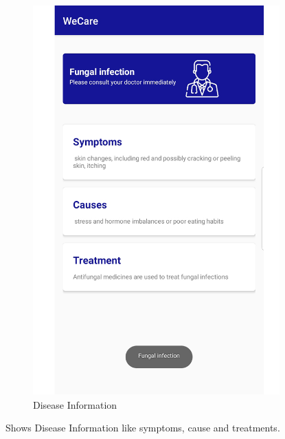 {\begin{figure}[H]
\begin{center}
\includegraphics[width=95mm, height = 150mm]{Outputnew/3.png}
\caption{Disease Information}
\end{center}
\end{figure}
Shows Disease Information like symptoms, cause and treatments. 


}
